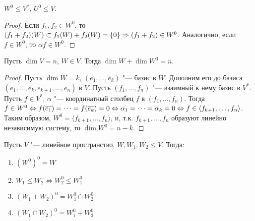 \begin{proposition}
	$W^0 \le V^*$, $U^0 \le V$.
\end{proposition}

\begin{proof}
	Если $f_1, f_2 \in W^0$, то $(f_1 + f_2)(W) \subset f_1(W) \hm{+} f_2(W) = \{0\} \Rightarrow (f_1 + f_2) \in W^0$. Аналогично, если $f \in W^0$, то $\alpha f \in W^0$.
\end{proof}

\begin{theorem}
	Пусть $\dim{V} = n$, $W \in V$. Тогда $\dim{W} + \dim{W^0} = n$.
\end{theorem}

\begin{proof}
	Пусть $\dim{W} = k$, $(\overline{e_1}, \dots, \overline{e_k})$ "--- базис в $W$. Дополним его до базиса $(\overline{e_1}, \dots, \overline{e_k}, \overline{e_{k+1}}, \dots, \overline{e_n})$ в $V$. Пусть $(f_1, \dots, f_n)$ "--- взаимный к нему базис в $V^*$. Пусть $f \in V^*$, $\alpha$ "--- координатный столбец $f$ в $(f_1, \dots, f_n)$. Тогда $f \in W^0 \Leftrightarrow f(\overline{e_1}) = \dots = f(\overline{e_k}) \hm{=} 0 \Leftrightarrow \alpha_1 \hm{=} \dots = \alpha_k = 0 \Leftrightarrow f \in \langle f_{k+1}, \dots, f_n\rangle$. Таким образом, $W^0 = \langle f_{k+1}, \dots, f_n \rangle$, и, т.\:к. $f_{k+1}, \dots, f_n$ образуют линейно независимую систему, то $\dim{W^0} = n - k$.
\end{proof}

\begin{theorem}Пусть $V$ "--- линейное пространство, $W, W_1, W_2 \le V$. Тогда:
	\begin{enumerate}
		\item $(W^0)^0 = W$
		\item $W_1 \le W_2 \Leftrightarrow W_2^0 \le W_1^0$
		\item $(W_1 + W_2)^0 = W_1^0 \cap W_2^0$
		\item $(W_1 \cap W_2)^0 = W_1^0 + W_2^0$
	\end{enumerate}
\end{theorem}

